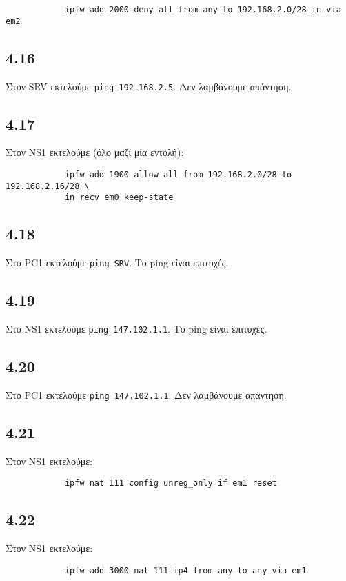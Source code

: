 \documentclass[a4paper, 12pt]{article}
\begin{document}
		\begin{verbatim}
			ipfw add 2000 deny all from any to 192.168.2.0/28 in via em2
		\end{verbatim}

	\subsection*{4.16}
		Στον SRV εκτελούμε \verb|ping 192.168.2.5|. Δεν λαμβάνουμε απάντηση.
		
	\subsection*{4.17} 
		Στον NS1 εκτελούμε (όλο μαζί μία εντολή):
		
		\begin{verbatim}
			ipfw add 1900 allow all from 192.168.2.0/28 to 192.168.2.16/28 \
			in recv em0 keep-state
		\end{verbatim}

	\subsection*{4.18}
		Στο PC1 εκτελούμε \verb|ping SRV|. Το ping είναι επιτυχές.

	\subsection*{4.19}
		Στο NS1 εκτελούμε \verb|ping 147.102.1.1|. Το ping είναι επιτυχές.

	\subsection*{4.20}
		Στο PC1 εκτελούμε \verb|ping 147.102.1.1|. Δεν λαμβάνουμε απάντηση.

	\subsection*{4.21}
		Στον NS1 εκτελούμε:
		
		\begin{verbatim}
			ipfw nat 111 config unreg_only if em1 reset
		\end{verbatim}

	\subsection*{4.22}
		Στον NS1 εκτελούμε:
		
		\begin{verbatim}
			ipfw add 3000 nat 111 ip4 from any to any via em1 
		\end{verbatim}
\end{document}
